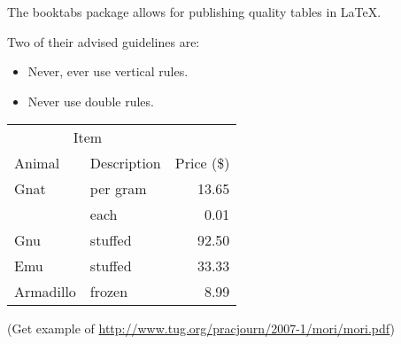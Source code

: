 \documentclass{mcreport}
\begin{document}
The booktabs package allows for publishing quality tables in \LaTeX{}.

Two of their advised guidelines are:

\begin{itemize}
    \item Never, ever use vertical rules.
    \item Never use double rules.
\end{itemize}

\begin{table}[!ht]
    \centering
    \begin{tabular}{@{}llr@{}} \toprule
        \multicolumn{2}{c}{Item} \\ \cmidrule(r){1-2}
        Animal & Description & Price (\$)\\ \midrule
        Gnat & per gram & 13.65 \\
        & each
        & 0.01 \\
        Gnu
        & stuffed
        & 92.50 \\
        Emu
        & stuffed
        & 33.33 \\
        Armadillo & frozen & 8.99 \\ \bottomrule
    \end{tabular}
\end{table}

(Get example of \url{http://www.tug.org/pracjourn/2007-1/mori/mori.pdf})
\end{document}
